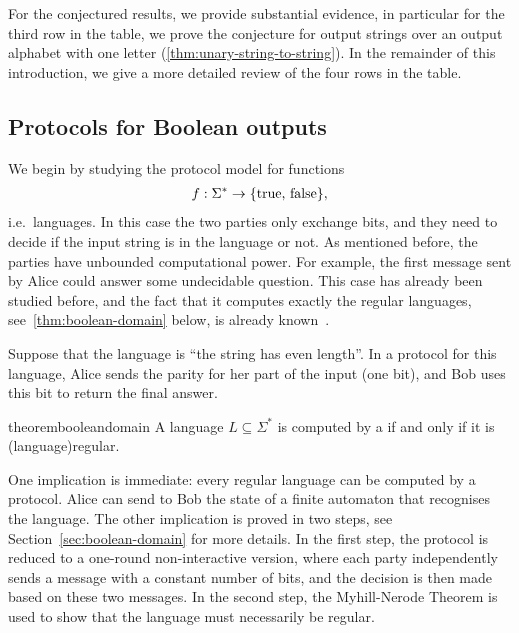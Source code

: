 For the conjectured results, we provide substantial evidence, in particular for
the third row in the table, we prove the conjecture for output strings over an
output alphabet with one letter (\cref{thm:unary-string-to-string}). In the
remainder of this introduction, we give a more detailed review of the four rows
in the table. 

\subsection{Protocols for Boolean outputs}
\label{sec:intro-boolean}

We begin by studying the protocol model for  functions
\begin{align*}
f : \Sigma^* \to \{\text{true, false}\},
\end{align*}
i.e.~languages. In this case the two parties only exchange bits, 
and they need to decide if the input string is in the language or not. As mentioned before, the parties have unbounded computational power. For example, the first message sent by Alice could answer  some undecidable question. This case has already been studied before, and the fact that it computes exactly the regular languages, see~\cref{thm:boolean-domain} below, is already known~\cite[Theorem 5]{hauser1989}.

\begin{myexample}[Parity]
    \label{ex:three-letters}
Suppose that the language is ``the string has even length''. In a protocol for this language, Alice sends the parity for her part of the input (one bit), and Bob uses this bit to return the final answer.  
\end{myexample}


\begin{restatable}{theorem}{booleandomain}
 \label{thm:boolean-domain} \cite[Theorem 5]{hauser1989}
 A language $L \subseteq \Sigma^*$ is computed by a  if and only if it is 
 \kl(language){regular}.
\end{restatable}
One implication is immediate: every regular language can be computed by a protocol.  Alice can send to Bob the state of a finite automaton that recognises the language. The other implication is proved in two steps, see Section~\ref{sec:boolean-domain} for more details. In the first step, the protocol is reduced to a one-round non-interactive version, where each party independently sends a message with a constant number of bits, and the decision is then made based on these two messages. In the second step,  the Myhill-Nerode Theorem is used to show that the language must necessarily be regular. 

